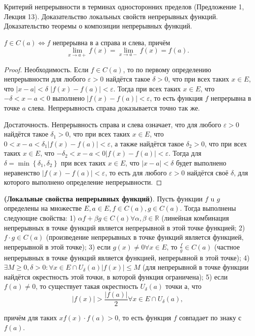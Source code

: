 \begin{problem}
Критерий непрерывности в терминах односторонних пределов (Предложение 1, Лекция
13). Доказательство локальных свойств непрерывных функций. Доказательство теоремы
о композиции непрерывных функций.
\end{problem}
\begin{proposition}
    $f \in C(a) \Leftrightarrow f$ непрерывна в а справа и слева, причём
    $$
        \lim _{x \rightarrow a+} f(x)=\lim _{x \rightarrow a-} f(x)=f(a) .
    $$
\end{proposition}

\begin{proof}
    Необходимость. Если $f \in C(a)$, то по первому определению непрерывности для любого $\varepsilon>0$ найдётся такое $\delta>0$, что при всех таких $x \in E$, что $|x-a|<\delta$ $|f(x)-f(a)|<\varepsilon$. Тогда при всех таких $x \in E$, что $-\delta<x-a<0$ выполнено $|f(x)-f(a)|<\varepsilon$, то есть функция $f$ непрерывна в точке $a$ слева. Непрерывность справа доказывается точно так же.

    Достаточность. Непрерывность справа и слева означает, что для любого $\varepsilon>0$ найдётся такое $\delta_1>0$, что при всех таких $x \in E$, что $0<x-a<\delta_1|f(x)-f(a)|<\varepsilon$, а также найдётся такое $\delta_2>0$, что при всех таких $x \in E$, что $-\delta_2<x-a<0|f(x)-f(a)|<\varepsilon$. Тогда для $\delta=\min \left\{\delta_1, \delta_2\right\}$ при всех таких $x \in E$, что $|x-a|<\delta$ будет выполнено неравенство $|f(x)-f(a)|<\varepsilon$, то есть для любого $\varepsilon>0$ найдётся своё $\delta$, для которого выполнено определение непрерывности.
\end{proof}

\begin{proposition}
    \textbf{(Локальные свойства непрерывных функций)}. Пусть функции $f$ u $g$ определены на множестве $E, a \in E, f \in C(a), g \in C(a)$. Тогда выполнены следующие свойства:
    1) $\alpha f+\beta g \in C(a) \forall \alpha, \beta \in \mathbb{R}$ (линейная комбинация непрерывных в точке функций является непрерывной в этой точке функцией;
    2) $f \cdot g \in C(a)$ (произведение непрерывных в точке функций является функцией, непрерывной в этой точке);
    3) если $g(x) \neq 0 \forall x \in E$, то $\frac{f}{g} \in C(a)$ (частное непрерывных в точке функций является функцией, непрерывной в этой точке);
    4) $\exists M \geq 0, \delta>0: \forall x \in E \cap U_\delta(a)|f(x)| \leq M$ (для непрерывной в точке функции найдётся окрестность этой точки, в которой функция ограничена);
    5) если $f(a) \neq 0$, то существует такая окрестность $U_\delta(a)$ точки $а$, что
    $$
        |f(x)|>\frac{|f(a)|}{2} \forall x \in E \cap U_\delta(a),
    $$

    причём для таких $x f(x) \cdot f(a)>0$, то есть функция $f$ совпадает по знаку с $f(a)$.
\end{proposition}

